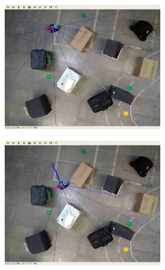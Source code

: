 \begin{figure}[H]
\begin{center}
    \begin{subfigure}[b]{0.60\textwidth}
        \begin{subfigure}[b]{0.24\textwidth}
            \includegraphics[width=\textwidth]{imagens/real_envs/real_env2_sac/1.png}
        \end{subfigure}
        \hfill
        \begin{subfigure}[b]{0.24\textwidth}
            \includegraphics[width=\textwidth]{imagens/real_envs/real_env2_sac/2.png}
        \end{subfigure}
        \hfill
        \begin{subfigure}[b]{0.24\textwidth}

\end{subfigure}
\end{subfigure}
\end{center}
\end{figure}

